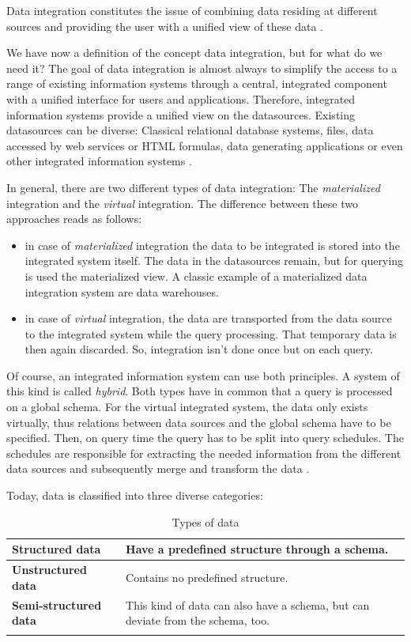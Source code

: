 Data integration constitutes the issue of combining data residing at different sources and providing the user with a unified view of these data \cite{Lenzerini:2002:DIT:543613.543644}. 

We have now a definition of the concept data integration, but for what do we need it? The goal of data integration is almost always to simplify the access to a range of existing information systems through a central, integrated component with a unified interface for users and applications. Therefore, integrated information systems provide a unified view on the datasources. Existing datasources can be diverse: Classical relational database systems, files, data accessed by web services or HTML formulas, data generating applications or even other integrated information systems \cite[p. 3-4]{DBLP:books/dp/LeserN2006}.

In general, there are two different types of data integration: The \emph{materialized} integration and the \emph{virtual} integration. The difference between these two approaches reads as follows:

\begin{itemize}
 \item \label{materialized_index}in case of \emph{materialized} integration the data to be integrated is stored  into the integrated system itself. The data in the datasources remain, but for querying is used the materialized view. A classic example of a materialized data integration system are data warehouses.
 \item \label{virtual_index}in case of \emph{virtual} integration, the data are transported from the data source to the integrated system while the query processing. That temporary data is then again discarded. So, integration isn't done once but on each query.
\end{itemize}

Of course, an integrated information system can use both principles. A system of this kind is called \emph{hybrid}\label{hybrid_index}. Both types have in common that a query is processed on a global schema. For the virtual integrated system, the data only exists virtually, thus relations between data sources and the global schema have to be specified. Then, on query time the query has to be split into query schedules. The schedules are responsible for extracting the needed information from the different data sources and subsequently merge and transform the data \cite[p. 86-88]{DBLP:books/dp/LeserN2006}.


Today, data is classified into three diverse categories:
\begin{longtable}{|l|p{}|}
 \hline
 \textbf{Structured data}  &  Have a predefined structure through a schema.\\ \hline
 \textbf{Unstructured data}    &  Contains no predefined structure.\\ \hline
 \textbf{Semi-structured data} & This kind of data can also have a schema, but can deviate from the schema, too.\\ \hline
\caption{Types of data \cite[p. 17]{DBLP:books/dp/LeserN2006}}
\label{type_of_data_label}
\end{longtable}

